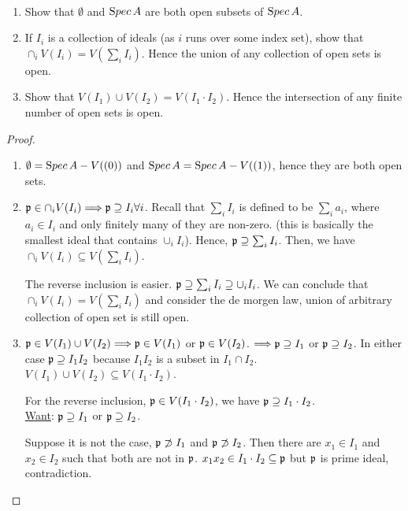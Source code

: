 \documentclass[11pt,fleqn]{book}
\begin{document}
\begin{exr}\ 
\begin{enumerate}[label=(\alph*)]
\item Show that $\emptyset$ and ${\text Spec\,} A$ are both open subsets of ${\text Spec\,} A$.
\item If $I_i$ is a collection of ideals (as $i$ runs over some index set), show that $\cap_i V(I_i) =
V(\sum_i I_i)$. Hence the union of any collection of open sets is open.
\item  Show that $V(I_1) \cup V(I_2) = V(I_1\cdot I_2)$. Hence the intersection of any finite number of open sets is open.
\end{enumerate}
\end{exr}
\begin{proof}
\begin{enumerate}[label=(\alph*)]
\item $\emptyset={\text Spec\,} A-V((0))$ and ${\text Spec\,} A={\text Spec\,} A-V((1))$, hence they are both open sets.
\item ${\mathfrak p}\in\cap_iV(I_i)\Longrightarrow {\mathfrak p}\supseteq I_i\forall i$. Recall that $\sum_i I_i$ is defined to be $\sum_i a_i$, where $a_i\in I_i$ and only finitely many of they are non-zero. (this is basically the smallest ideal that contains $\cup_i I_i$). Hence, ${\mathfrak p}\supseteq \sum_i I_i$. Then, we have $\cap_i V(I_i)\subseteq V(\sum_i I_i)$.

The reverse inclusion is easier. ${\mathfrak p}\supseteq \sum_i I_i\supseteq \cup_iI_i$. We can conclude that $\cap_i V(I_i)=V(\sum_i I_i)$ and consider the de morgen law, union of arbitrary collection of open set is still open.
\item ${\mathfrak p}\in V(I_1)\cup V(I_2)\Longrightarrow {\mathfrak p}\in V(I_1)$ or ${\mathfrak p}\in V(I_2)$. $\Longrightarrow {\mathfrak p}\supseteq I_1$ or ${\mathfrak p}\supseteq I_2$. In either case ${\mathfrak p}\supseteq I_1I_2$ because $I_1I_2$ is a subset in $I_1\cap I_2$. $V(I_1)\cup V(I_2)\subseteq V(I_1\cdot I_2)$.

For the reverse inclusion, ${\mathfrak p}\in V(I_1\cdot I_2)$, we have ${\mathfrak p}\supseteq I_1\cdot I_2$.\\
\underline{Want}: ${\mathfrak p}\supseteq I_1$ or ${\mathfrak p}\supseteq I_2$.

Suppose it is not the case, ${\mathfrak p}\not \supset I_1$ and ${\mathfrak p}\not \supset I_2$. Then there are $x_1\in I_1$ and $x_2\in I_2$ such that both are not in ${\mathfrak p}$. $x_1x_2\in I_1\cdot I_2 \subseteq {\mathfrak p}$ but ${\mathfrak p}$ is prime ideal, contradiction.
\end{enumerate}
\end{proof}
\end{document}
